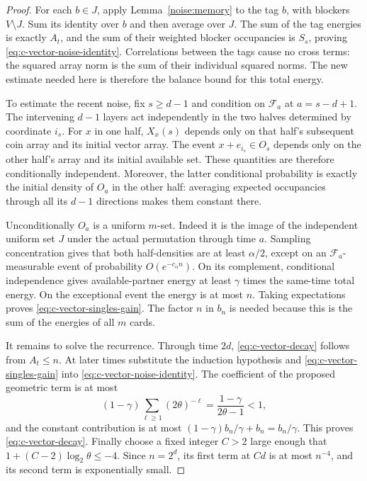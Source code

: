 \begin{proof}
For each $b\in J$, apply Lemma~\ref{noise:memory} to the tag $b$,
with blockers $V\setminus J$. Sum its identity over $b$ and then
average over $J$. The sum of the tag energies is exactly $A_t$, and
the sum of their weighted blocker occupancies is $S_s$, proving
\eqref{eq:c-vector-noise-identity}. Correlations between the tags
cause no cross terms: the squared array norm is the sum of their
individual squared norms. The new estimate needed here is therefore
the balance bound for this total energy.

To estimate the recent noise, fix $s\ge d-1$ and condition on
$\mathcal F_a$ at $a=s-d+1$.  The intervening $d-1$ layers act
independently in the two halves determined by coordinate $i_s$.
For $x$ in one half, $X_x(s)$ depends only on that half's subsequent
coin array and its initial vector array.  The event
$x+e_{i_s}\in O_s$ depends only on the other half's array and its
initial available set.  These quantities are therefore conditionally
independent.  Moreover, the latter conditional probability is exactly
the initial density of $O_a$ in the other half: averaging expected
occupancies through all its $d-1$ directions makes them constant there.

Unconditionally $O_a$ is a uniform $m$-set.  Indeed it is the image of
the independent uniform set $J$ under the actual permutation through
time $a$.  Sampling concentration gives that both half-densities are
at least $\alpha/2$, except on an $\mathcal F_a$-measurable event of
probability $O(e^{-c_\alpha n})$.  On its complement, conditional
independence gives available-partner energy at least $\gamma$ times
the same-time total energy.  On the exceptional event the energy is
at most $n$.  Taking expectations proves
\eqref{eq:c-vector-singles-gain}.  The factor $n$ in $b_n$ is needed
because this is the sum of the energies of all $m$ cards.

It remains to solve the recurrence.  Through time $2d$,
\eqref{eq:c-vector-decay} follows from $A_t\le n$.  At later times
substitute the induction hypothesis and
\eqref{eq:c-vector-singles-gain} into
\eqref{eq:c-vector-noise-identity}.  The coefficient of the proposed
geometric term is at most
\[
 (1-\gamma)\sum_{\ell\ge1}(2\theta)^{-\ell}
 =\frac{1-\gamma}{2\theta-1}<1,
\]
and the constant contribution is at most
$(1-\gamma)b_n/\gamma+b_n=b_n/\gamma$.
This proves \eqref{eq:c-vector-decay}.  Finally choose a fixed integer
$C>2$ large enough that $1+(C-2)\log_2\theta\le-4$.
Since $n=2^d$, its first term at $Cd$ is at most $n^{-4}$, and its
second term is exponentially small.
\end{proof}

